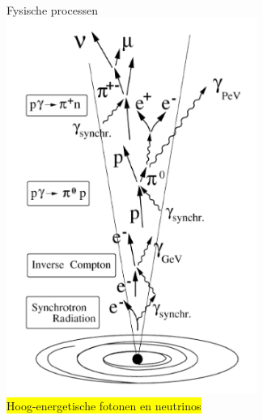 \newpage

\begin{center}
{\blue Fysische processen}\\[5mm]
\includegraphics[keepaspectratio,height=12.3cm]{jet}\\[5mm]
\colorbox{yellow}{Hoog-energetische fotonen en neutrinos}
\end{center}
